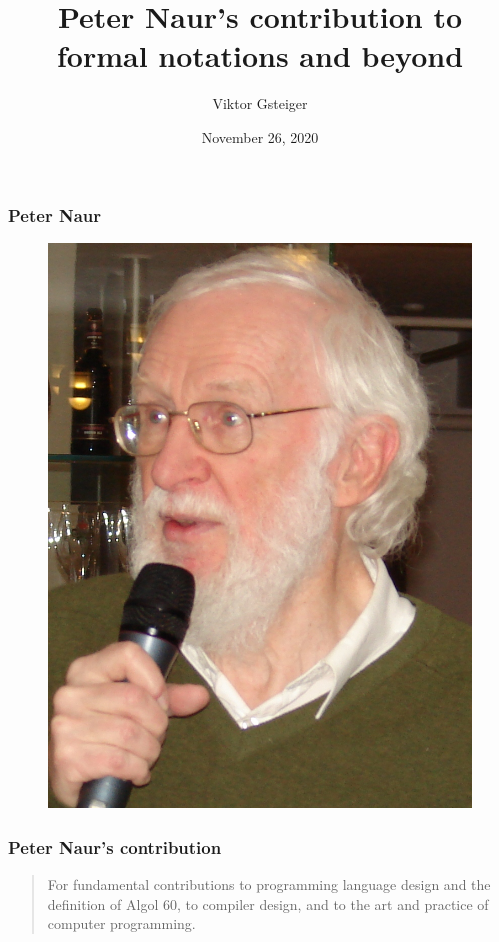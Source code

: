 \documentclass{beamer}
\title[Formalization]{Peter Naur's contribution to formal notations and beyond} %
\author{Viktor Gsteiger} %
\institute[unibas] %
{
University of Basel \\ %
\medskip
\textit{Seminar Turing Award Winners and Their Contributions} \\
\textit{v.gsteiger@unibas.ch} %
}
\date{November 26, 2020} %
\begin{document}
\begin{frame}
\titlepage %
\end{frame}

\begin{frame}
	\frametitle{Peter Naur}
	\begin{figure}
		\includegraphics[height=\dimexpr
		\textheight-3\baselineskip-\parskip-.2em-
		\abovecaptionskip-\belowcaptionskip\relax]{Peternaur}
		\caption{\cite{naur}}
		\label{fig:naur}
	\end{figure}
\end{frame}

\begin{frame}
	\frametitle{Peter Naur's contribution}
	
	\blockquote{For fundamental contributions to programming language design and the definition of Algol 60, to compiler design, and to the art and practice of computer programming.}
\end{frame}
\end{document}
